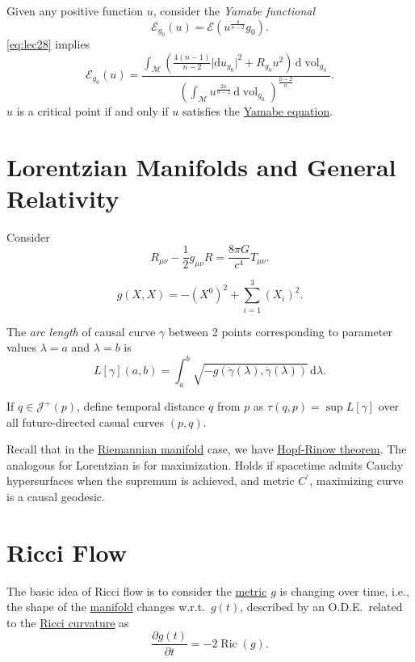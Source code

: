 Given any positive function \(u\), consider the \emph{Yamabe functional}
\[
	\mathcal{E} _{g_0}(u) = \mathcal{E} (u^{\frac{4}{n-2}} g_0).
\]
\autoref{eq:lec28} implies
\[
	\mathcal{E} _{g_0}(u) = \frac{\int _\mathcal{M} \left( \frac{4(n-1)}{n-2}\vert \mathrm{d} u_{g_0} \vert ^2 + R_{g_0}u^2 \right) \,\mathrm{d} \mathop{\mathrm{vol}}_{g_0} }{\left( \int _\mathcal{M} u^{\frac{2n}{n-2}} \,\mathrm{d} \mathop{\mathrm{vol}}_{g_0} \right) ^{\frac{n-2}{n}}}.
\]
\(u\) is a critical point if and only if \(u\) satisfies the \hyperref[eq:Yamabe]{Yamabe equation}.

\section{Lorentzian Manifolds and General Relativity}
Consider
\[
	R_{\mu \nu } - \frac{1}{2}g_{\mu \nu } R = \frac{8 \pi G}{c^4} T_{\mu \nu }.
\]

\[
	g(X, X) = -(X^0)^2 + \sum_{i=1}^3 (X_i)^2.
\]

\begin{definition}
	The \emph{arc length} of causal curve \(\gamma \) between 2 points corresponding to parameter values \(\lambda = a\) and \(\lambda = b\) is
	\[
		L[\gamma ](a, b) = \int_{a}^{b} \sqrt{-g(\dot{\gamma }(\lambda ), \dot{\gamma }(\lambda )  )} \,\mathrm{d}\lambda .
	\]
\end{definition}

If \(q\in \mathcal{J} ^+(p)\), define temporal distance \(q\) from \(p\) as \(\tau (q, p) = \sup L[\gamma ]\) over  all future-directed casual curves \((p, q)\).

Recall that in the \hyperref[def:Riemannian-manifold]{Riemannian manifold} case, we have \hyperref[thm:Hopf-Rinow]{Hopf-Rinow theorem}. The analogous for Lorentzian is for maximization. Holds if spacetime admits Cauchy hypersurfaces when the supremum is achieved, and metric \(C^{\prime} \), maximizing curve is a causal geodesic.

\section{Ricci Flow}
The basic idea of Ricci flow is to consider the \hyperref[def:Riemannian-metric]{metric} \(g\) is changing over time, i.e., the shape of the \hyperref[def:Riemannian-manifold]{manifold} changes w.r.t.\ \(g(t)\), described by an O.D.E.\ related to the \hyperref[def:Ricci-curvature]{Ricci curvature} as
\[
	\frac{\partial g(t)}{\partial t} = -2 \mathop{\mathrm{Ric}}(g) .
\]